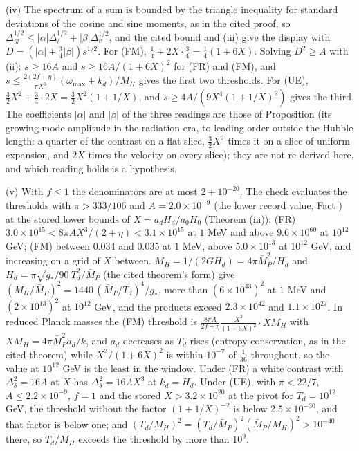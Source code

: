 (iv) The spectrum of a sum is bounded by the triangle inequality for standard deviations of the cosine and sine moments, as in the cited proof, so $\Delta_{\mathcal{R}}^{1/2} \le |\alpha|\Delta_{\delta}^{1/2} + |\beta|\Delta_{v}^{1/2}$, and the cited bound and (iii) give the display with $D = (|\alpha| + \tfrac34|\beta|)s^{1/2}$. For (FM), $\tfrac14 + 2X\cdot\tfrac34 = \tfrac14(1 + 6X)$. Solving $D^{2} \ge A$ with (ii): $s \ge 16A$ and $s \ge 16A/(1 + 6X)^{2}$ for (FR) and (FM), and $s \le \tfrac{2(2f + \eta)}{\pi X^{3}}(\omega_{\max} + k_{d})/M_{H}$ gives the first two thresholds. For (UE), $\tfrac32X^{2} + \tfrac34\cdot2X = \tfrac32X^{2}(1 + 1/X)$, and $s \ge 4A/(9X^{4}(1 + 1/X)^{2})$ gives the third. The coefficients $|\alpha|$ and $|\beta|$ of the three readings are those of Proposition  (its growing-mode amplitude in the radiation era, to leading order outside the Hubble length: a quarter of the contrast on a flat slice, $\tfrac32X^{2}$ times it on a slice of uniform expansion, and $2X$ times the velocity on every slice); they are not re-derived here, and which reading holds is a hypothesis.

(v) With $f \le 1$ the denominators are at most $2 + 10^{-20}$. The check evaluates the thresholds with $\pi > 333/106$ and $A = 2.0 \times 10^{-9}$ (the lower record value, Fact ) at the stored lower bounds of $X = a_{d}H_{d}/a_{0}H_{0}$ (Theorem (iii)): (FR) $3.0 \times 10^{15} < 8\pi AX^{3}/(2 + \eta) < 3.1 \times 10^{15}$ at $1$ MeV and above $9.6 \times 10^{60}$ at $10^{12}$ GeV; (FM) between $0.034$ and $0.035$ at $1$ MeV, above $5.0 \times 10^{13}$ at $10^{12}$ GeV, and increasing on a grid of $X$ between. $M_{H} = 1/(2GH_{d}) = 4\pi\bar M_{P}^{2}/H_{d}$ and $H_{d} = \pi\sqrt{g_{*}/90}\,T_{d}^{2}/\bar M_{P}$ (the cited theorem's form) give $(M_{H}/\bar M_{P})^{2} = 1440\,(\bar M_{P}/T_{d})^{4}/g_{*}$, more than $(6 \times 10^{43})^{2}$ at $1$ MeV and $(2 \times 10^{13})^{2}$ at $10^{12}$ GeV, and the products exceed $2.3 \times 10^{42}$ and $1.1 \times 10^{27}$. In reduced Planck masses the (FM) threshold is $\tfrac{8\pi A}{2f + \eta}\tfrac{X^{2}}{(1 + 6X)^{2}}\cdot XM_{H}$ with $XM_{H} = 4\pi\bar M_{P}^{2}a_{d}/k$, and $a_{d}$ decreases as $T_{d}$ rises (entropy conservation, as in the cited theorem) while $X^{2}/(1 + 6X)^{2}$ is within $10^{-7}$ of $\tfrac{1}{36}$ throughout, so the value at $10^{12}$ GeV is the least in the window. Under (FR) a white contrast with $\Delta_{\delta}^{2} = 16A$ at $X$ has $\Delta_{\delta}^{2} = 16AX^{3}$ at $k_{d} = H_{d}$. Under (UE), with $\pi < 22/7$, $A \le 2.2 \times 10^{-9}$, $f = 1$ and the stored $X > 3.2 \times 10^{20}$ at the pivot for $T_{d} = 10^{12}$ GeV, the threshold without the factor $(1 + 1/X)^{-2}$ is below $2.5 \times 10^{-30}$, and that factor is below one; and $(T_{d}/M_{H})^{2} = (T_{d}/\bar M_{P})^{2}(\bar M_{P}/M_{H})^{2} > 10^{-40}$ there, so $T_{d}/M_{H}$ exceeds the threshold by more than $10^{9}$.


